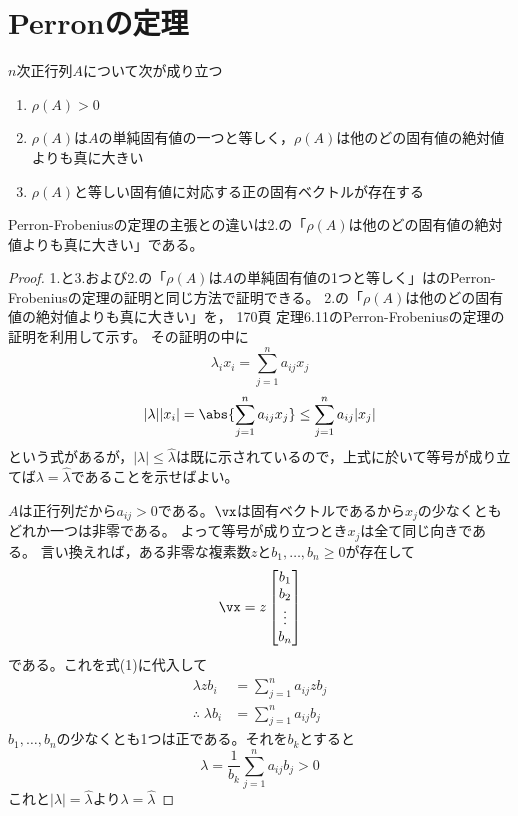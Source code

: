     \section{Perronの定理}
        \begin{shadebox}
            $n$次正行列$A$について次が成り立つ
            \begin{enumerate}
                \item $\rho(A)>0$
                \item $\rho(A)$は$A$の単純固有値の一つと等しく，$\rho(A)$は他のどの固有値の絶対値よりも真に大きい
                \item $\rho(A)$と等しい固有値に対応する正の固有ベクトルが存在する
            \end{enumerate}
        \end{shadebox}
        Perron-Frobeniusの定理の主張との違いは2.の「$\rho(A)$は他のどの固有値の絶対値よりも真に大きい」である。
        \begin{proof}
            1.と3.および2.の「$\rho(A)$は$A$の単純固有値の1つと等しく」は\cite{システム線形代数}のPerron-Frobeniusの定理の証明と同じ方法で証明できる。
            2.の「$\rho(A)$は他のどの固有値の絶対値よりも真に大きい」を，\cite{システム線形代数} 170頁 定理6.11のPerron-Frobeniusの定理の証明を利用して示す。
            その証明の中に
            \begin{equation}
                \lambda_ix_i = \sum_{j=1}^{n}{a_{ij}x_j}
            \end{equation}
            \[|\lambda||x_i| = \abs{\sum_{j=1}^{n}{a_{ij}x_j}} \leq \sum_{j=1}^{n}{a_{ij}|x_j|}\]
            という式があるが，$|\lambda|\leq\hat{\lambda}$は既に示されているので，上式に於いて等号が成り立てば$\lambda=\hat{\lambda}$であることを示せばよい。
            \par
            $A$は正行列だから$a_{ij}>0$である。$\vx$は固有ベクトルであるから$x_j$の少なくともどれか一つは非零である。
            よって等号が成り立つとき$x_j$は全て同じ向きである。
            言い換えれば，ある非零な複素数$z$と$b_1,\dotsc,b_n\geq0$が存在して
            \[
                \vx = z
                \begin{bmatrix}
                    b_1\\
                    b_2\\
                    \vdots\\
                    b_n
                \end{bmatrix}
            \]
            である。これを式(1)に代入して
            \begin{align*}
                \lambda zb_i &= \sum_{j=1}^{n}{a_{ij}zb_j}\\
                \therefore\; \lambda b_i &= \sum_{j=1}^{n}{a_{ij}b_j}
            \end{align*}
            $b_1,\dotsc,b_n$の少なくとも1つは正である。それを$b_k$とすると
            \[\lambda = \frac{1}{b_k}\sum_{j=1}^{n}{a_{ij}b_j} > 0\]
            これと$|\lambda|=\hat{\lambda}$より$\lambda=\hat{\lambda}$
        \end{proof}